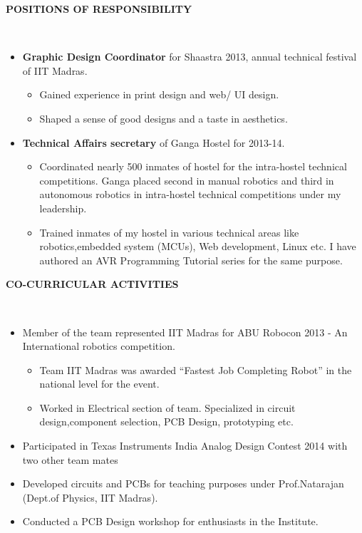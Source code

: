 \documentclass[a4paper,10pt]{article}
\newcommand{\lsep}{-0.5cm}
\newcommand{\resheading}[1]{{\small \colorbox{mygrey}{\begin{minipage}{0.975\textwidth}{\textbf{#1 \vphantom{p\^{E}}}}\end{minipage}}}}
\begin{document}
\resheading{\textbf{POSITIONS OF RESPONSIBILITY} }\\[\lsep]
    \begin{itemize}
        \item \textbf{Graphic Design Coordinator} for Shaastra 2013, annual technical festival of 
        IIT Madras.
        \begin{itemize}
            \item Gained experience in print design and web/ UI design.
            \item Shaped a sense of good designs and a taste in aesthetics.            
        \end{itemize}
        \item \textbf{Technical Affairs secretary} of Ganga Hostel for 2013-14.
        \vspace{-3pt}
            \begin{itemize}
            \item Coordinated nearly 500 inmates of hostel for the intra-hostel technical competitions. Ganga placed second in manual robotics and third in autonomous robotics in intra-hostel technical competitions under my leadership.
            \item Trained inmates of my hostel in various technical areas like robotics,embedded system (MCUs), Web development, Linux etc. I have authored an AVR Programming  Tutorial series for the same purpose.
            \end{itemize}
    \end{itemize}

\resheading{\textbf{CO-CURRICULAR ACTIVITIES} }\\[\lsep]
    \begin{itemize}
        \item Member of the team represented IIT Madras for ABU Robocon 2013 - An International robotics competition.
        \begin{itemize}
            \item Team IIT Madras was awarded “Fastest Job Completing Robot” in the national level for the event.
            \item  Worked in Electrical section of team. Specialized in circuit design,component selection, PCB Design, prototyping etc.
        \end{itemize}
        \item Participated in Texas Instruments India Analog Design Contest 2014 with two other team mates
        \item Developed circuits and PCBs for teaching purposes under Prof.Natarajan (Dept.of Physics, IIT Madras).
        \item Conducted a PCB Design workshop for enthusiasts in the Institute.
    \end{itemize}

    


\end{document}

